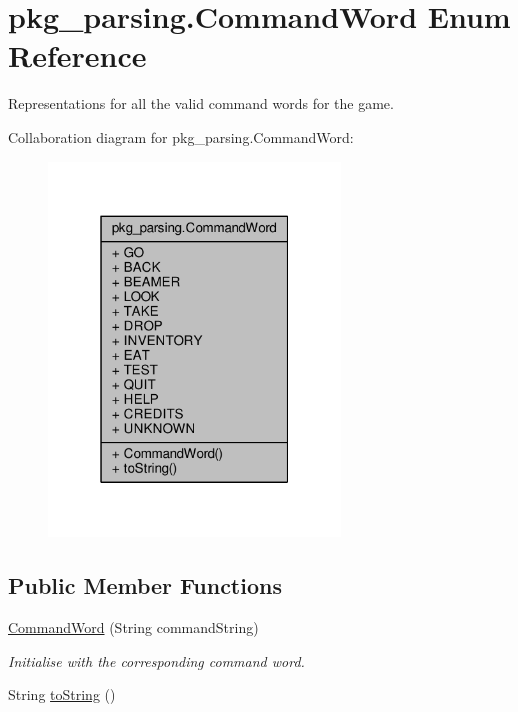 \hypertarget{enumpkg__parsing_1_1CommandWord}{\section{pkg\-\_\-parsing.\-Command\-Word Enum Reference}
\label{enumpkg__parsing_1_1CommandWord}
}


Representations for all the valid command words for the game.  




Collaboration diagram for pkg\-\_\-parsing.\-Command\-Word\-:\nopagebreak
\begin{figure}[H]
\begin{center}
\leavevmode
\includegraphics[width=220pt]{enumpkg__parsing_1_1CommandWord__coll__graph}
\end{center}
\end{figure}
\subsection*{Public Member Functions}
\begin{DoxyCompactItemize}
\item 
\hyperlink{enumpkg__parsing_1_1CommandWord_a7ff71159ae2c26835f5336580152d088}{Command\-Word} (String command\-String)
\begin{DoxyCompactList}\small\item\em Initialise with the corresponding command word. \end{DoxyCompactList}\item 
String \hyperlink{enumpkg__parsing_1_1CommandWord_ab6d70b61b7418ce7dfa930bda64132c5}{to\-String} ()
\end{DoxyCompactItemize}
